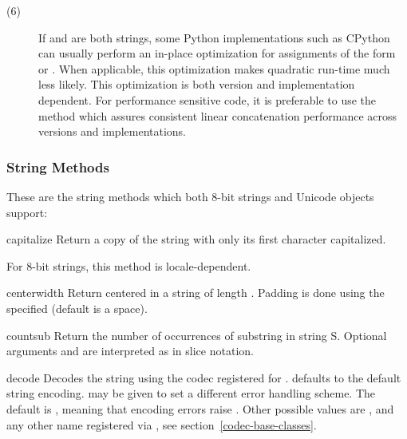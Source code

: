 \begin{description}
\item[(6)] If  and  are both strings, some Python
implementations such as CPython can usually perform an in-place optimization
for assignments of the form  or
.  When applicable, this optimization makes
quadratic run-time much less likely.  This optimization is both version
and implementation dependent.  For performance sensitive code, it is
preferable to use the  method which assures consistent
linear concatenation performance across versions and implementations.

\end{description}


\subsubsection{String Methods \label{string-methods}}

These are the string methods which both 8-bit strings and Unicode
objects support:

\begin{methoddesc}[string]{capitalize}{}
Return a copy of the string with only its first character capitalized.

For 8-bit strings, this method is locale-dependent.
\end{methoddesc}

\begin{methoddesc}[string]{center}{width}
Return centered in a string of length . Padding is done
using the specified  (default is a space).
\end{methoddesc}

\begin{methoddesc}[string]{count}{sub}
Return the number of occurrences of substring  in string
S.  Optional arguments  and
 are interpreted as in slice notation.
\end{methoddesc}

\begin{methoddesc}[string]{decode}{}
Decodes the string using the codec registered for .
 defaults to the default string encoding.  
may be given to set a different error handling scheme.  The default is
, meaning that encoding errors raise
.  Other possible values are ,
 and any other name registered via
, see section~\ref{codec-base-classes}.
\end{methoddesc}

